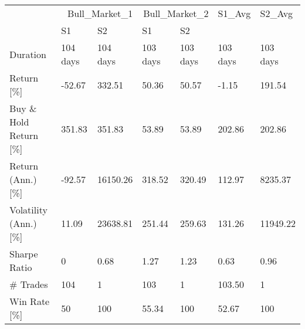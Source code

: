 \begin{tabular}{lllllll}
\toprule
 & \multicolumn{2}{r}{Bull_Market_1} & \multicolumn{2}{r}{Bull_Market_2} & S1_Avg & S2_Avg \\
 & S1 & S2 & S1 & S2 &  &  \\
\midrule
Duration & 104 days   & 104 days   & 103 days   & 103 days   & 103 days   & 103 days   \\
Return  [\%] & -52.67 & 332.51 & 50.36 & 50.57 & -1.15 & 191.54 \\
Buy \& Hold Return  [\%] & 351.83 & 351.83 & 53.89 & 53.89 & 202.86 & 202.86 \\
Return (Ann.)  [\%] & -92.57 & 16150.26 & 318.52 & 320.49 & 112.97 & 8235.37 \\
Volatility (Ann.)  [\%] & 11.09 & 23638.81 & 251.44 & 259.63 & 131.26 & 11949.22 \\
Sharpe Ratio & 0  & 0.68 & 1.27 & 1.23 & 0.63 & 0.96 \\
\# Trades & 104 & 1 & 103 & 1 & 103.50 & 1  \\
Win Rate  [\%] & 50  & 100  & 55.34 & 100  & 52.67 & 100  \\
\bottomrule
\end{tabular}
